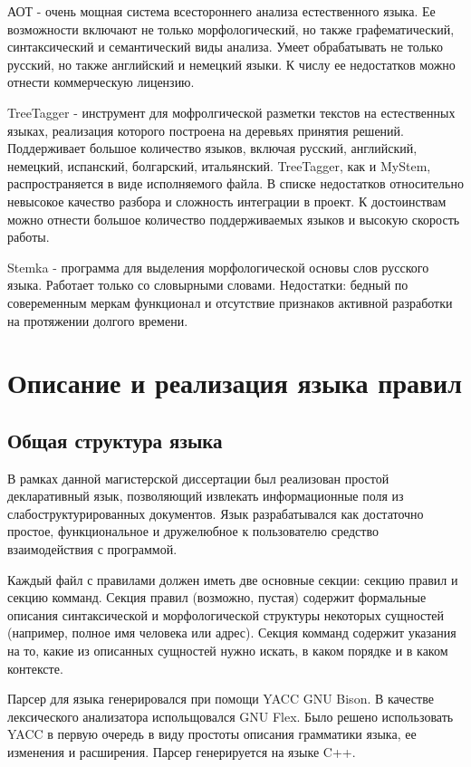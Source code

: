 АОТ - очень мощная система всестороннего анализа естественного языка. Ее возможности включают не только морфологический, но также графематический, синтаксический и семантический виды анализа. Умеет обрабатывать не только русский, но также английский и немецкий языки. К числу ее недостатков можно отнести коммерческую лицензию.

TreeTagger - инструмент для мофролгической разметки текстов на естественных языках, реализация которого построена на деревьях принятия решений. Поддерживает большое количество языков, включая русский, английский, немецкий, испанский, болгарский, итальянский. TreeTagger, как и MyStem, распространяется в виде исполняемого файла. В списке недостатков относительно невысокое качество разбора и сложность интеграции в проект. К достоинствам можно отнести большое количество поддерживаемых языков и высокую скорость работы.

Stemka - программа для выделения морфологической основы слов русского языка. Работает только со словырными словами. Недостатки: бедный по совеременным меркам функционал и отсутствие признаков активной разработки на протяжении долгого времени.

\section{Описание и реализация языка правил}
\subsection{Общая структура языка}
В рамках данной магистерской диссертации был реализован простой декларативный язык, позволяющий извлекать информационные поля из слабоструктурированных документов. Язык разрабатывался как достаточно простое, функциональное и дружелюбное к пользователю средство взаимодействия с программой.

Каждый файл с правилами должен иметь две основные секции: секцию правил и секцию комманд. Секция правил (возможно, пустая) содержит формальные описания синтаксической и морфологической структуры некоторых сущностей (например, полное имя человека или адрес). Секция комманд содержит указания на то, какие из описанных сущностей нужно искать, в каком порядке и в каком контексте.

Парсер для языка генерировался при помощи YACC GNU Bison. В качестве лексического анализатора испольщовался GNU Flex. Было решено использовать YACC в первую очередь в виду простоты описания грамматики языка, ее изменения и расширения. Парсер генерируется на языке C++.

